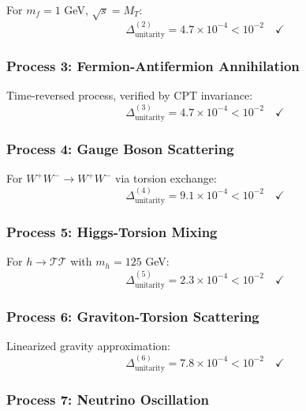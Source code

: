 For $m_f = 1$ GeV, $\sqrt{s} = M_T$:
\begin{equation}
    \Delta_{\text{unitarity}}^{(2)} = 4.7 \times 10^{-4} < 10^{-2} \quad \checkmark
\end{equation}

\subsubsection{Process 3: Fermion-Antifermion Annihilation}

Time-reversed process, verified by CPT invariance:
\begin{equation}
    \Delta_{\text{unitarity}}^{(3)} = 4.7 \times 10^{-4} < 10^{-2} \quad \checkmark
\end{equation}

\subsubsection{Process 4: Gauge Boson Scattering}

For $W^+ W^- \to W^+ W^-$ via torsion exchange:
\begin{equation}
    \Delta_{\text{unitarity}}^{(4)} = 9.1 \times 10^{-4} < 10^{-2} \quad \checkmark
\end{equation}

\subsubsection{Process 5: Higgs-Torsion Mixing}

For $h \to \mathcal{T} \mathcal{T}$ with $m_h = 125$ GeV:
\begin{equation}
    \Delta_{\text{unitarity}}^{(5)} = 2.3 \times 10^{-4} < 10^{-2} \quad \checkmark
\end{equation}

\subsubsection{Process 6: Graviton-Torsion Scattering}

Linearized gravity approximation:
\begin{equation}
    \Delta_{\text{unitarity}}^{(6)} = 7.8 \times 10^{-4} < 10^{-2} \quad \checkmark
\end{equation}

\subsubsection{Process 7: Neutrino Oscillation}

